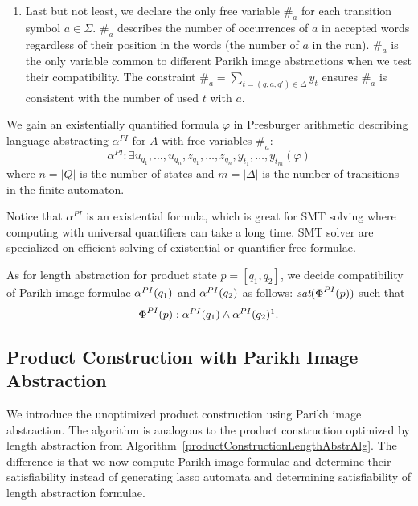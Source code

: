 \begin{enumerate}
    \item \label{clauses:hash_original} Last but not least, we declare the only free variable $\#_a$ for each transition symbol $ a \in \Sigma$. $\#_a$ describes the number of occurrences of $a$ in accepted words regardless of their position in the words (the number of $a$ in the run). $\#_a$ is the only variable common to different Parikh image abstractions when we test their compatibility. The constraint $\#_a = \sum_{t = (q, a, q') \in \Delta} y_t$ ensures $\#_a$ is consistent with the number of used $t$ with $a$.

\end{enumerate}

We gain an existentially quantified formula $\varphi$ in Presburger arithmetic describing language abstracting $\alpha^{PI}$ for $A$ with free variables $\#_a$:
$$ \alpha^{PI} : \exists u_{q_1},\ldots,u_{q_n},z_{q_1},\ldots,z_{q_n},y_{t_1},\ldots,y_{t_m} ( \varphi ) $$
where $n = \lvert Q \rvert$ is the number of states and $m = \lvert \Delta \rvert$ is the number of transitions in the finite automaton.

Notice that $\alpha^{PI}$ is an existential formula, which is great for SMT solving where computing with universal quantifiers can take a long time. SMT solver are specialized on efficient solving of existential or quantifier-free formulae.

As for length abstraction for product state $p = [q_1, q_2]$, we decide compatibility of Parikh image formulae $\alpha^{PI}(q_1)$ and $\alpha^{PI}(q_2)$ as follows: $\emph{sat}(\emph{$\Phi$}^{PI}(p))$ such that
\[
    \compatPI{p} : \abstPI{q_1} \wedge \abstPI{q_2}\footnotemark \text{.}
\]

\subsection{Product Construction with Parikh Image Abstraction}

We introduce the unoptimized product construction using Parikh image abstraction. The algorithm is analogous to the product construction optimized by length abstraction from Algorithm~\ref{productConstructionLengthAbstrAlg}. The difference is that we now compute Parikh image formulae and determine their satisfiability instead of generating lasso automata and determining satisfiability of length abstraction formulae.

